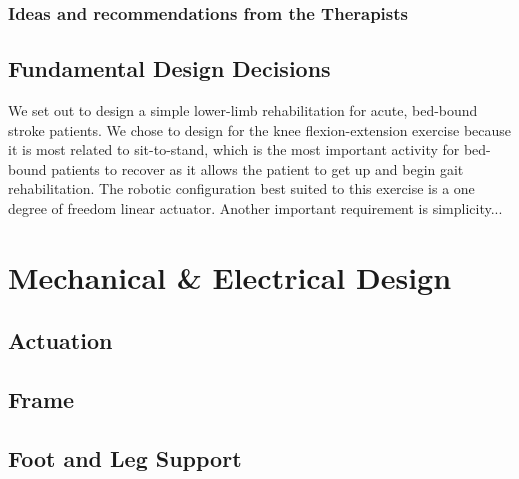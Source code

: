 \documentclass[12pt]{article}
\begin{document}
	 \subsubsection{Ideas and recommendations from the Therapists}
	
	\subsection{Fundamental Design Decisions}
%
We set out to design a simple lower-limb rehabilitation for acute, bed-bound stroke patients. We chose to design for the knee flexion-extension exercise because it is most related to sit-to-stand, which is the most important activity for bed-bound patients to recover as it allows the patient to get up and begin gait rehabilitation. The robotic configuration best suited to this exercise is a one degree of freedom linear actuator. 
	Another important requirement is simplicity...

\section{Mechanical \& Electrical Design}
	\subsection{Actuation}
%

	\subsection{Frame}
%
	\subsection{Foot and Leg Support}
%
\end{document}
